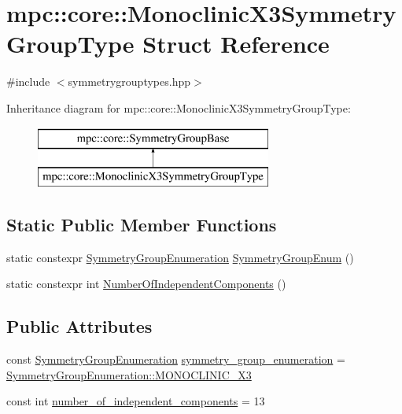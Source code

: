 \hypertarget{structmpc_1_1core_1_1_monoclinic_x3_symmetry_group_type}{}\section{mpc\+:\+:core\+:\+:Monoclinic\+X3\+Symmetry\+Group\+Type Struct Reference}
\label{structmpc_1_1core_1_1_monoclinic_x3_symmetry_group_type}


{\ttfamily \#include $<$symmetrygrouptypes.\+hpp$>$}

Inheritance diagram for mpc\+:\+:core\+:\+:Monoclinic\+X3\+Symmetry\+Group\+Type\+:\begin{figure}[H]
\begin{center}
\leavevmode
\includegraphics[height=2.000000cm]{structmpc_1_1core_1_1_monoclinic_x3_symmetry_group_type}
\end{center}
\end{figure}
\subsection*{Static Public Member Functions}
\begin{DoxyCompactItemize}
\item 
static constexpr \mbox{\hyperlink{namespacempc_1_1core_a9d979684062547055a0ef5c13077bad8}{Symmetry\+Group\+Enumeration}} \mbox{\hyperlink{structmpc_1_1core_1_1_monoclinic_x3_symmetry_group_type_aae7de40f076054a8c14a1bac58cdc9be}{Symmetry\+Group\+Enum}} ()
\item 
static constexpr int \mbox{\hyperlink{structmpc_1_1core_1_1_monoclinic_x3_symmetry_group_type_a6b5a4d8be05150c313bbc5b543cd48ab}{Number\+Of\+Independent\+Components}} ()
\end{DoxyCompactItemize}
\subsection*{Public Attributes}
\begin{DoxyCompactItemize}
\item 
const \mbox{\hyperlink{namespacempc_1_1core_a9d979684062547055a0ef5c13077bad8}{Symmetry\+Group\+Enumeration}} \mbox{\hyperlink{structmpc_1_1core_1_1_monoclinic_x3_symmetry_group_type_a904063da9f5f483cf16eab309a18db0c}{symmetry\+\_\+group\+\_\+enumeration}} = \mbox{\hyperlink{namespacempc_1_1core_a9d979684062547055a0ef5c13077bad8ab31f5171fdded777eb3112da45967b57}{Symmetry\+Group\+Enumeration\+::\+M\+O\+N\+O\+C\+L\+I\+N\+I\+C\+\_\+\+X3}}
\item 
const int \mbox{\hyperlink{structmpc_1_1core_1_1_monoclinic_x3_symmetry_group_type_ad8e0f7a066c0ec03b2c5dc66243c1613}{number\+\_\+of\+\_\+independent\+\_\+components}} = 13
\end{DoxyCompactItemize}


